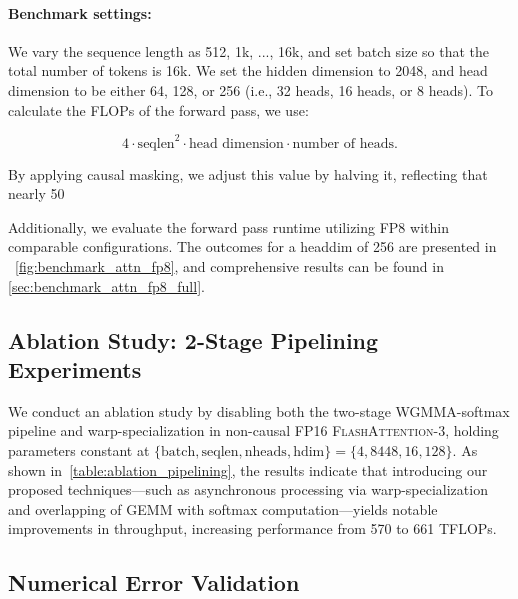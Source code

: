 \paragraph{Benchmark settings:} We vary the sequence length as 512, 1k, ..., 16k, and set batch size so that the total number of tokens is 16k. We set the hidden dimension to 2048, and head dimension to be either 64, 128, or 256 (i.e., 32 heads, 16 heads, or 8 heads). To calculate the FLOPs of the forward pass, we use:

\begin{equation*}
  4 \cdot \text{seqlen}^2 \cdot \text{head dimension} \cdot \text{number of heads}.
\end{equation*}

By applying causal masking, we adjust this value by halving it, reflecting that nearly 50%

Additionally, we evaluate the forward pass runtime utilizing FP8 within comparable configurations. The outcomes for a headdim of 256 are presented in ~\cref{fig:benchmark_attn_fp8}, and comprehensive results can be found in \cref{sec:benchmark_attn_fp8_full}.

\subsection{Ablation Study: 2-Stage Pipelining Experiments}
\label{sec:2-stage-pipelining-experiments}

We conduct an ablation study by disabling both the two-stage WGMMA-softmax pipeline and warp-specialization in non-causal FP16 \textsc{FlashAttention-3}, holding parameters constant at $\{\text{batch}, \text{seqlen}, \text{nheads}, \text{hdim}\} = \{ 4, 8448, 16, 128\}$.
As shown in~\cref{table:ablation_pipelining}, the results indicate that introducing our proposed techniques—such as asynchronous processing via warp-specialization and overlapping of GEMM with softmax computation—yields notable improvements in throughput, increasing performance from 570 to 661 TFLOPs.

\subsection{Numerical Error Validation}
\label{sec:numerical_error}

